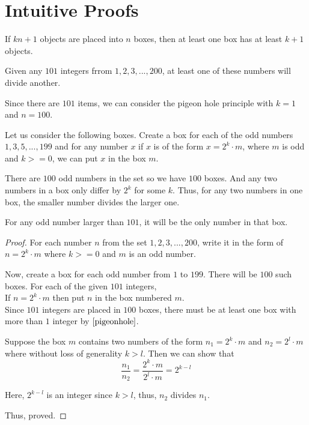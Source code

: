 \chapter{Intuitive Proofs}


\begin{principle}
  \label{pigeonhole}
If $kn+1$ objects are placed into $n$ boxes,
then at least one box has at least $k+1$ objects.
\end{principle}

\begin{proposition}
  Given any $101$ integers frrom ${1, 2, 3, ..., 200}$, at least one of these numbers will divide another.
\end{proposition}

\begin{scratch}
Since there are $101$ items, we can consider the pigeon hole principle with $k=1$ and $n=100$.

Let us consider the following boxes. Create a box for each of the odd numbers ${1, 3, 5, ..., 199}$ and for any number $x$ if $x$ is of the form $x = 2^k \cdot m$, where $m$ is odd and $k >= 0$, we can put $x$ in the box $m$.

There are $100$ odd numbers in the set so we have $100$ boxes. And any two numbers in a box only differ by $2^k$ for some $k$. Thus, for any two numbers in one box, the smaller number divides the larger one.

For any odd number larger than $101$, it will be the only number in that box.
\end{scratch}

\begin{proof}
  For each number $n$ from the set ${1, 2, 3, ..., 200}$, write it in the form of $n = 2^k \cdot m$ where $k >= 0$ and $m$ is an odd number.

  Now, create a box for each odd number from $1$ to $199$. There will be $100$ such boxes. For each of the given $101$ integers, \\

  If $n = 2^k \cdot m$ then put $n$ in the box numbered $m$. \\

  Since $101$ integers are placed in $100$ boxes, there must be at least one box with more than $1$ integer by $\ref{pigeonhole}$.

  Suppose the box $m$ contains two numbers of the form $n_1 = 2^k \cdot m$ and $n_2 = 2^l \cdot m$ where without loss of generality $k > l$. Then we can show that
  $$\frac{n_1}{n_2} = \frac{2^k \cdot m}{2^l \cdot m} = 2^{k-l}$$

  Here, $2^{k-l}$ is an integer since $k > l$, thus, $n_2$ divides $n_1$.

  Thus, proved.
\end{proof}

